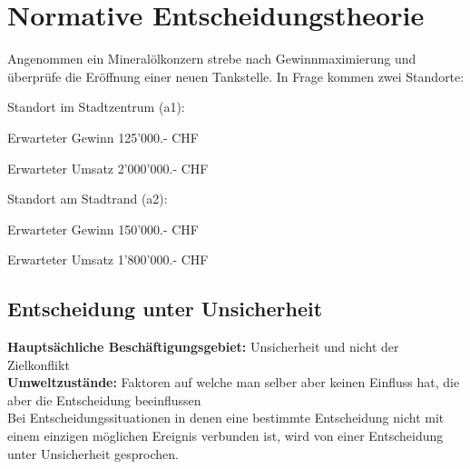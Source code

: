 \section{Normative Entscheidungstheorie}
\begin{example}
	Angenommen ein Mineralölkonzern strebe nach Gewinnmaximierung und überprüfe die Eröffnung einer neuen Tankstelle. In Frage kommen zwei Standorte:
	\begin{multicols}{2}
		\begin{compactenum}
			\item Standort im Stadtzentrum (a1): 
			\begin{compactitem}
				\item Erwarteter Gewinn 125'000.- CHF 
				\item Erwarteter Umsatz 2'000'000.- CHF
			\end{compactitem}
			\item Standort am Stadtrand (a2): 
			\begin{compactitem}
				\item Erwarteter Gewinn 150'000.- CHF 
				\item Erwarteter Umsatz 1'800'000.- CHF
			\end{compactitem}
		\end{compactenum}
	\end{multicols}
\end{example}

\subsection{Entscheidung unter Unsicherheit}
\textbf{Hauptsächliche Beschäftigungsgebiet:} Unsicherheit und nicht der Zielkonflikt \\
\textbf{Umweltzustände:} Faktoren auf welche man selber aber keinen Einfluss hat, die aber die Entscheidung beeinflussen\\
Bei Entscheidungssituationen in denen eine bestimmte Entscheidung nicht mit einem einzigen möglichen Ereignis verbunden ist, wird von einer Entscheidung unter Unsicherheit gesprochen.

